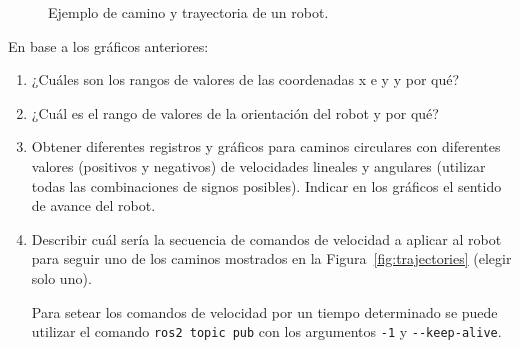 \documentclass[tp]{lcc}
\begin{document}
\begin{figure}[!htbp]
    \centering
    \hspace*{2cm}
    \caption{Ejemplo de camino y trayectoria de un robot.}
    \label{fig:trajectory_example}
\end{figure}


En base a los gráficos anteriores:

\begin{enumerate}

\item ¿Cuáles son los rangos de valores de las coordenadas x e y y por qué?

\item  ¿Cuál es el rango de valores de la orientación del robot y por qué?

\item Obtener diferentes registros y gráficos para caminos circulares con diferentes valores (positivos y negativos) de velocidades lineales y angulares (utilizar todas las combinaciones de signos posibles). Indicar en los gráficos el sentido de avance del robot.

\item Describir cuál sería la secuencia de comandos de velocidad a aplicar al robot para seguir uno de los caminos mostrados en la Figura~\ref{fig:trajectories} (elegir solo uno).

\begin{nota}
	Para setear los comandos de velocidad por un tiempo determinado se puede utilizar el comando \lstinline[style=bash]{ros2 topic pub} con los argumentos \lstinline[style=bash]{-1} y \lstinline[style=bash]{--keep-alive}.
\end{nota}

\end{enumerate}
\end{document}
